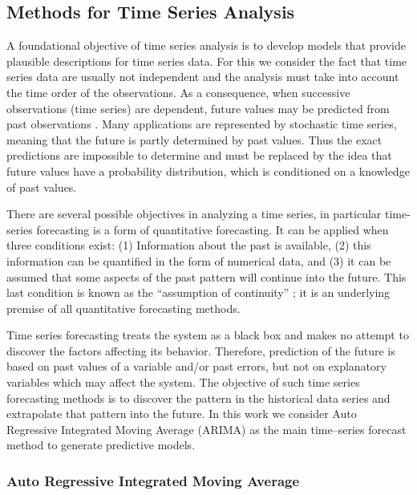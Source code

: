 \subsection{Methods for Time Series Analysis}
\label{Sec:MethodsTSA}

A foundational objective of time series analysis is to develop models that provide plausible descriptions for time series data. For this we consider the fact that time series data are usually not independent and the analysis must take into account the time order of the observations. As a consequence, when successive observations (time series) are dependent, future values may be predicted from past observations \cite{Mills2019}. 
Many applications are represented by stochastic time series, meaning that the future is partly determined by past values. Thus the exact predictions are impossible to determine and must be replaced by the idea that future values have a probability distribution, which is conditioned on a knowledge of past values. 

There are several possible objectives in analyzing a time series, in particular time-series forecasting is a form of quantitative forecasting. It can be applied when three conditions exist: (1) Information about the past is available, (2) this information can be quantified in the form of numerical data, and (3) it can be assumed that some aspects of the past pattern will continue into the future. This last condition is known as the ``assumption of continuity'' \cite{Makridakis2008}; it is an underlying premise of all quantitative forecasting methods. 

Time series forecasting treats the system as a black box and makes no attempt to discover the factors affecting its behavior. Therefore, prediction of the future is based on past values of a variable and/or past errors, but not on explanatory variables which may affect the system. The objective of such time series forecasting methods is to discover the pattern in the historical data series and extrapolate that pattern into the future. 
In this work we consider Auto Regressive Integrated Moving Average (ARIMA) as the main time--series forecast method to generate predictive models.

\subsubsection{Auto Regressive Integrated Moving Average}
\label{Sec:TheoryARIMA}

